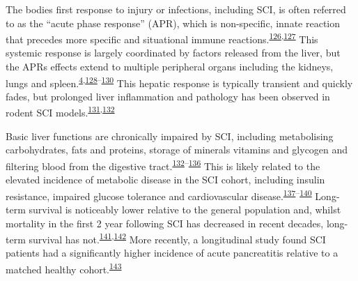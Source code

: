 \documentclass[
]{article}
\begin{document}
The bodies first response to injury or infections, including SCI, is often referred to as the ``acute phase response'' (APR), which is non-specific, innate reaction that precedes more specific and situational immune reactions.\textsuperscript{\protect\hyperlink{ref-gordon_acute-phase_1985}{126},\protect\hyperlink{ref-gruys_acute_2005}{127}}
This systemic response is largely coordinated by factors released from the liver, but the APRs effects extend to multiple peripheral organs including the kidneys, lungs and spleen.\textsuperscript{\protect\hyperlink{ref-gris_systemic_2008}{4},\protect\hyperlink{ref-bao_systemic_2012}{128}--\protect\hyperlink{ref-fleming_remote_2012}{130}}
This hepatic response is typically transient and quickly fades, but prolonged liver inflammation and pathology has been observed in rodent SCI models.\textsuperscript{\protect\hyperlink{ref-goodus_dietary_2018}{131},\protect\hyperlink{ref-sauerbeck_spinal_2014}{132}}

Basic liver functions are chronically impaired by SCI, including metabolising carbohydrates, fats and proteins, storage of minerals vitamins and glycogen and filtering blood from the digestive tract.\textsuperscript{\protect\hyperlink{ref-sauerbeck_spinal_2014}{132}--\protect\hyperlink{ref-chow_pharmacology_2012}{136}}
This is likely related to the elevated incidence of metabolic disease in the SCI cohort, including insulin resistance, impaired glucose tolerance and cardiovascular disease.\textsuperscript{\protect\hyperlink{ref-bauman_carbohydrate_2001}{137}--\protect\hyperlink{ref-myers_cardiovascular_2007}{140}}
Long-term survival is noticeably lower relative to the general population and, whilst mortality in the first 2 year following SCI has decreased in recent decades, long-term survival has not.\textsuperscript{\protect\hyperlink{ref-strauss_trends_2006}{141},\protect\hyperlink{ref-shavelle_improvements_2015}{142}}
More recently, a longitudinal study found SCI patients had a significantly higher incidence of acute pancreatitis relative to a matched healthy cohort.\textsuperscript{\protect\hyperlink{ref-ho_increased_2021}{143}}
\end{document}
